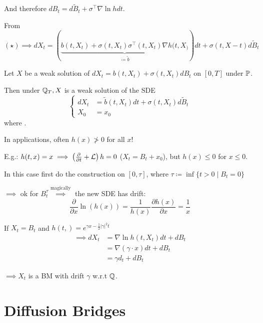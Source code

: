 And therefore $dB_t = d\tilde{B}_t+\sigma^\intercal \nabla \ln h dt$.

From $(\star)\implies dX_t = (\underbrace{b(t,X_t)+\sigma(t,X_t)\sigma^\intercal(t,X_t)\nabla h(t,X_)}_{\coloneqq \tilde{b}})dt + \sigma(t,X-t)d\tilde{B}_t$

\begin{proposition}\label{prop:2.3}
    Let $X$ be a weak solution of $dX_t=b(t,X_t)+\sigma(t,X_t)dB_t$ on $[0,T]$ under $\mathbb{P}$.

    Then under $\mathbb{Q}_T, X$ is a weak solution of the SDE 
    \[\begin{cases}
        dX_t &= \tilde{b}(t,X_t)dt+\sigma(t,X_t)d\tilde{B}_t\\
        X_0&=x_0
    \end{cases}\]
    where .
\end{proposition}

\begin{remark}
    In applications, often $h(x)\not> 0$ for all $x$!

    E.g.: $h(t,x)=x\implies \left(\frac{\partial}{\partial t}+\mathcal{L} \right)h=0$ ($X_t=B_t+x_0$), but $h(x)\leq 0$ for $x\leq 0$.

    In this case first do the construction on $[0,\tau]$, where $\tau\coloneqq\inf\{t>0\mid B_t=0\}$

    $\implies$ ok for $B_t^\tau\stackrel{\text{magically}}{\implies}$ the new SDE has drift:
    \[\frac{\partial}{\partial x}\ln(h(x))=\frac{1}{h(x)}\frac{\partial h(x)}{\partial x}=\frac{1}{x}\] 
\end{remark}

\begin{example} %
    If $X_t=B_t$ and $h(t,)=e^{\gamma x-\frac{1}{2}\vert \gamma\vert^2 t}$
    \begin{align*}
        \implies dX_t &= \nabla \ln h(t,X_t)dt + dB_t\\
        &=\nabla(\gamma \cdot x)dt + dB_t \\
        &=\gamma d_t + d B_t
    \end{align*}

    $\implies X_t$ is a BM with drift $\gamma$ w.r.t $\mathbb{Q}$.
\end{example}

\section{Diffusion Bridges}

